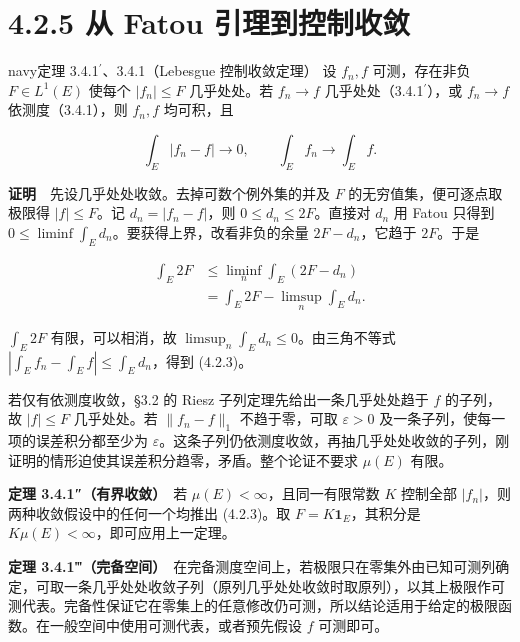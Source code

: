 \documentclass[11pt,a4paper]{article}
\begin{document}
\clearpage\section[\S{}4.2.5 从 Fatou
引理到控制收敛]{4.2.5 从 Fatou
引理到控制收敛}\label{ux4ece-fatou-ux5f15ux7406ux5230ux63a7ux5236ux6536ux655b}

\begin{sboxenv}{navy}{定理 3.4.1\ensuremath{{}^{\prime}}、3.4.1（Lebesgue 控制收敛定理）}
设 \(f_n,f\) 可测，存在非负 \(F\in L^1(E)\) 使每个 \(|f_n|\le F\)
几乎处处。若 \(f_n\to f\) 几乎处处（3.4.1\ensuremath{{}^{\prime}}），或 \(f_n\to f\)
依测度（3.4.1），则 \(f_n,f\) 均可积，且

\begin{equation*}
\int_E|f_n-f|\longrightarrow0,\qquad \int_E f_n\longrightarrow\int_E f .\tag{4.2.3}
\end{equation*}

\end{sboxenv}

\textbf{证明}　先设几乎处处收敛。去掉可数个例外集的并及 \(F\)
的无穷值集，便可逐点取极限得 \(|f|\le F\)。记 \(d_n=|f_n-f|\)，则
\(0\le d_n\le2F\)。直接对 \(d_n\) 用 Fatou 只得到
\(0\le\liminf\int_E d_n\)。要获得上界，改看非负的余量 \(2F-d_n\)，它趋于
\(2F\)。于是

\begin{equation*}
\begin{aligned}
\int_E 2F
&\le\liminf_n\int_E(2F-d_n)\\
&=\int_E 2F-\limsup_n\int_E d_n .
\end{aligned}
\end{equation*}

\(\int_E2F\) 有限，可以相消，故 \(\limsup_n\int_Ed_n\le0\)。由三角不等式
\(|\int_E f_n-\int_E f|\le\int_Ed_n\)，得到 (4.2.3)。

若仅有依测度收敛，§3.2 的 Riesz 子列定理先给出一条几乎处处趋于 \(f\)
的子列，故 \(|f|\le F\) 几乎处处。若 \(\|f_n-f\|_1\) 不趋于零，可取
\(\varepsilon>0\) 及一条子列，使每一项的误差积分都至少为
\(\varepsilon\)。这条子列仍依测度收敛，再抽几乎处处收敛的子列，刚证明的情形迫使其误差积分趋零，矛盾。整个论证不要求
\(\mu(E)\) 有限。

\textbf{定理 3.4.1″（有界收敛）}　若 \(\mu(E)<\infty\)，且同一有限常数
\(K\) 控制全部 \(|f_n|\)，则两种收敛假设中的任何一个均推出 (4.2.3)。取
\(F=K\mathbf1_E\)，其积分是 \(K\mu(E)<\infty\)，即可应用上一定理。

\textbf{定理
3.4.1‴（完备空间）}　在完备测度空间上，若极限只在零集外由已知可测列确定，可取一条几乎处处收敛子列（原列几乎处处收敛时取原列），以其上极限作可测代表。完备性保证它在零集上的任意修改仍可测，所以结论适用于给定的极限函数。在一般空间中使用可测代表，或者预先假设
\(f\) 可测即可。
\end{document}
